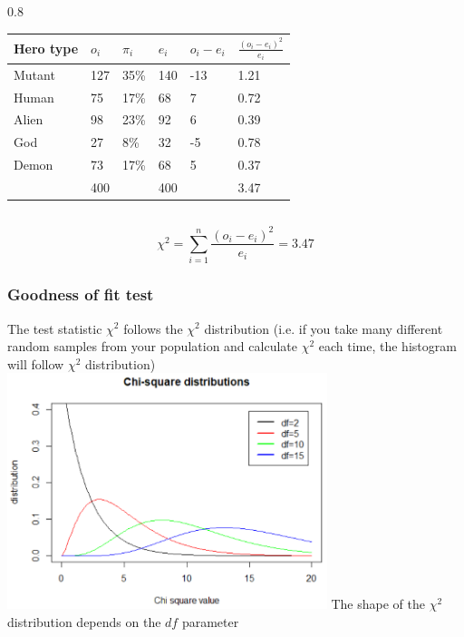 \documentclass{beamer}
\begin{document}
\begin{frame}
\begin{columns}
    \begin{column} { 0.8 \textwidth}
\begin{table}[h]
\begin{tabular}{@{}llllll@{}}
\toprule
\textbf{Hero type} & $o_i$ & $\pi_i$ & $e_i$ & $o_i -e_i$ & $\frac{(o_i-e_i)^{2}}{e_i}$ \\ \midrule
Mutant                  & 127          & 35\%           & 140          & -13             & 1.21                           \\
Human                    & 75           & 17\%           & 68           & 7               & 0.72                           \\
Alien                   & 98           & 23\%           & 92           & 6               & 0.39                           \\
God                     & 27           & 8\%            & 32           & -5              & 0.78                           \\
Demon                   & 73           & 17\%           & 68           & 5               & 0.37                           \\ \bottomrule
 & 400 & & 400 & & 3.47 \\
\end{tabular}
\end{table}
    \end{column}
  \end{columns}
  \[ \chi^{2} = \sum_{i=1}^{n} \frac{(o_{i} - e_{i})^{2}}{e_{i}} = 3.47\]
\end{frame}


\begin{frame}
  \frametitle{Goodness of fit test}
    The test statistic $\chi^{2}$ follows the $\chi^{2}$ distribution
    (i.e. if you take many different random samples from your population
    and calculate $\chi^2$ each time,
    the histogram will follow $\chi^2$ distribution)
\vfill
    \includegraphics[width=0.7\textwidth]{img/chap6-chi-square-distributions.png}
\vfill
    The shape of the $\chi^{2}$ distribution depends on the $df$ parameter
\end{frame}
\end{document}
